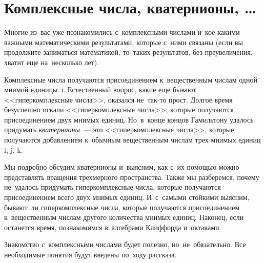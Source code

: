 
\section*{Комплексные числа, кватернионы, \ldots}



\begingroup
    \def\iconst{\mathrm{i}}%
    \def\jconst{\mathrm{j}}%
    \def\kconst{\mathrm{k}}%

Многие из~вас уже познакомились с~комплексными числами и~кое-какими важными
математическими результатами, которые с~ними связаны
(если вы продолжите заниматься математикой, то~таких результатов,
без преувеличения, хватит еще на~несколько лет).

Комплексные числа получаются присоединением к~вещественным числам одной мнимой
единицы~$\iconst$.
Естественный вопрос, какие еще бывают <<гиперкомплексные числа>>, оказался
не~так-то прост.
Долгое время безуспешно искали <<гиперкомплексные числа>>, которые получаются
присоединением двух мнимых единиц.
Но~в~конце концов Гамильтону удалось придумать \emph{кватернионы}~--- это
<<гиперкомплексные числа>>, которые получаются добавлением к~обычным
вещественным числам трех мнимых единиц $\iconst$, $\jconst$, $\kconst$.

Мы подробно обсудим кватернионы и~выясним, как с~их помощью можно представлять
вращения трехмерного пространства.
Также мы разберемся, почему не~удалось придумать гиперкомплексные числа,
которые получаются присоединением всего двух мнимых единиц.
И~с~самыми стойкими выясним, бывают~ли гиперкомплексные числа, которые
получаются присоединением к~вещественным числам другого количества мнимых
единиц.
Наконец, если останется время, познакомимся в~алгебрами Клиффорда и~октавами.

Знакомство с~комплексными числами будет полезно, но~не~обязательно.
Все необходимые понятия будут введены по~ходу рассказа.

\endgroup %

